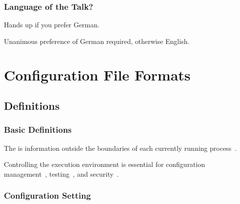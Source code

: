 \documentclass{beamer}
\date{9.3.2018}
\begin{document}
\renewcommand{\enquote}[1]{\emph{``#1''}} %

\begin{frame}
	\titlepage
	\doclicenseThis
\end{frame}

\begin{assignment}
	\frametitle{Language of the Talk?}
	\begin{task}
	Hands up if you prefer German.
	\end{task}
	Unanimous preference of German required, otherwise English.
\end{assignment}

\section{Configuration File Formats}

\subsection{Definitions}

\begin{frame}
	\frametitle{Basic Definitions}
	The  is information outside the boundaries of each currently running process~\cite{corbato1971multics}.

	Controlling the execution environment is essential for configuration management~\cite{cons2002pan,huang2015confvalley}, testing~\cite{van2010automating,wang2009context}, and security~\cite{goldberg1996secure,schreuders2012towards,perkins2009automatically,liang2003isolated}.
\end{frame}

\begin{frame}
	\frametitle{Configuration Setting}
	
\end{frame}
\end{document}
